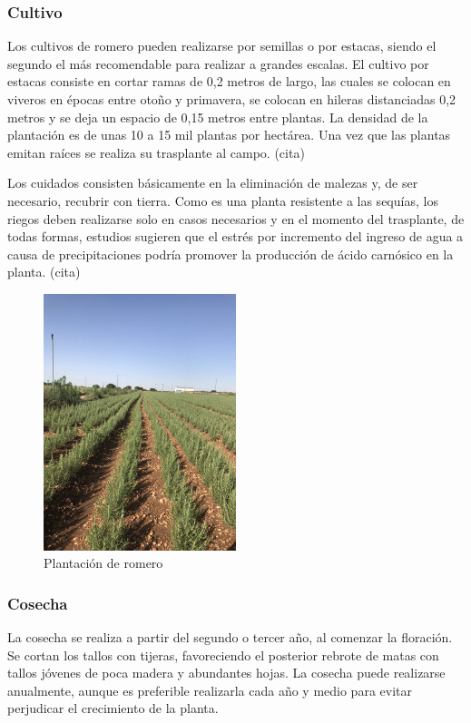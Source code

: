 \documentclass[11pt,a4paper]{article}
\begin{document}
\subsubsection{Cultivo}

Los cultivos de romero pueden realizarse por semillas o por estacas, siendo el segundo el más recomendable para realizar a grandes escalas. El cultivo por estacas consiste en cortar ramas de 0,2 metros de largo, las cuales se colocan en viveros en épocas entre otoño y primavera, se colocan en hileras distanciadas 0,2 metros y se deja un espacio de 0,15 metros entre plantas.
La densidad de la plantación es de unas 10 a 15 mil plantas por hectárea.
Una vez que las plantas emitan raíces se realiza su trasplante al campo. (cita)

Los cuidados consisten básicamente en la eliminación de malezas y, de ser necesario, recubrir con tierra. Como es una planta resistente a las sequías, los riegos deben realizarse solo en casos necesarios y en el momento del trasplante, de todas formas, estudios sugieren que el estrés por incremento del ingreso de agua a causa de precipitaciones podría promover la producción de ácido carnósico en la planta. (cita)

\begin{figure}[H]
	\centering
	\includegraphics[width=0.5\textwidth]{romero3_plantacion}
	\caption{Plantación de romero\label{plantacion}}
\end{figure}

\subsubsection{Cosecha}

La cosecha se realiza a partir del segundo o tercer año, al comenzar la floración.
Se cortan los tallos con tijeras, favoreciendo el posterior rebrote de matas con tallos jóvenes de poca madera y abundantes hojas. La cosecha puede realizarse anualmente, aunque es preferible realizarla cada año y medio para evitar perjudicar el crecimiento de la planta.
\end{document}
